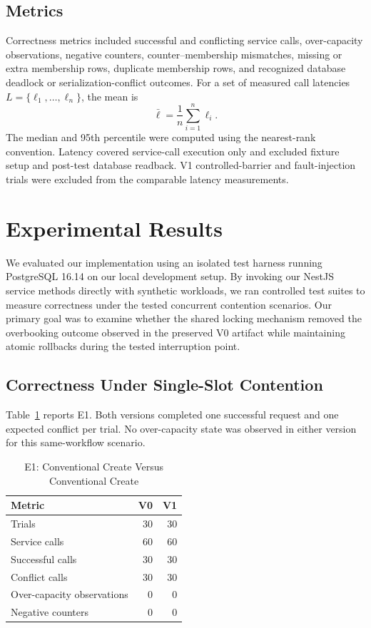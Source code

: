\documentclass[conference]{IEEEtran}
\begin{document}
\subsection{Metrics}
Correctness metrics included successful and conflicting service calls, over-capacity observations, negative counters, counter--membership mismatches, missing or extra membership rows, duplicate membership rows, and recognized database deadlock or serialization-conflict outcomes. For a set of measured call latencies $L=\{\ell_1,\ldots,\ell_n\}$, the mean is
\begin{equation}
\bar{\ell}=\frac{1}{n}\sum_{i=1}^{n}\ell_i.
\end{equation}
The median and 95th percentile were computed using the nearest-rank convention. Latency covered service-call execution only and excluded fixture setup and post-test database readback. V1 controlled-barrier and fault-injection trials were excluded from the comparable latency measurements.

\section{Experimental Results}
We evaluated our implementation using an isolated test harness running PostgreSQL 16.14 on our local development setup. By invoking our NestJS service methods directly with synthetic workloads, we ran controlled test suites to measure correctness under the tested concurrent contention scenarios. Our primary goal was to examine whether the shared locking mechanism removed the overbooking outcome observed in the preserved V0 artifact while maintaining atomic rollbacks during the tested interruption point.
\subsection{Correctness Under Single-Slot Contention}
Table~\ref{tab:e1} reports E1. Both versions completed one successful request and one expected conflict per trial. No over-capacity state was observed in either version for this same-workflow scenario.

\begin{table}[!t]
\caption{E1: Conventional Create Versus Conventional Create}
\label{tab:e1}
\centering
\footnotesize
\begin{tabular}{lrr}
\toprule
Metric & V0 & V1 \\
\midrule
Trials & 30 & 30 \\
Service calls & 60 & 60 \\
Successful calls & 30 & 30 \\
Conflict calls & 30 & 30 \\
Over-capacity observations & 0 & 0 \\
Negative counters & 0 & 0 \\
\bottomrule
\end{tabular}
\end{table}
\end{document}
